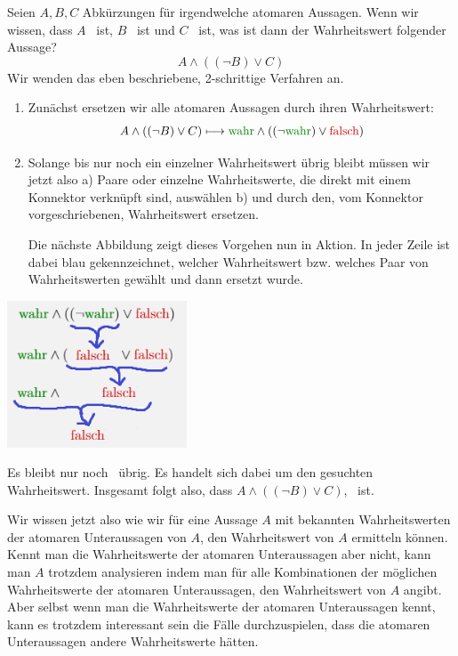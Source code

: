 \documentclass[../../main.tex]{subfiles}
\begin{document}
\begin{example}
Seien $A, B, C$ Abkürzungen für irgendwelche atomaren Aussagen. Wenn wir wissen, dass $A$ \wahr\  ist, $B$ \wahr\  ist und $C$ \falsch\   ist, was ist dann der Wahrheitswert folgender Aussage?
\[A \land ( (\lnot B) \lor C)\]
Wir wenden das eben beschriebene, 2-schrittige Verfahren an.
\begin{enumerate}
    \item Zunächst ersetzen wir alle atomaren Aussagen durch ihren Wahrheitswert:
    \[A \land ( (\lnot B) \lor C) \longmapsto  \wahr \land ((\lnot \wahr) \lor \falsch)\]
    \item Solange bis nur noch ein einzelner Wahrheitswert übrig bleibt müssen wir jetzt also a) Paare oder einzelne Wahrheitswerte, die direkt mit einem Konnektor verknüpft sind, auswählen b) und durch den, vom Konnektor vorgeschriebenen, Wahrheitswert ersetzen.
    
    Die nächste Abbildung zeigt dieses Vorgehen nun in Aktion. In jeder Zeile ist dabei blau gekennzeichnet, welcher Wahrheitswert bzw. welches Paar von Wahrheitswerten gewählt und dann ersetzt wurde. 
\end{enumerate}
\begin{center}
\includegraphics[width=0.4\textwidth]{images/TEMP_wahrheitsalg.png}
\end{center}
Es bleibt nur noch \falsch\  übrig. Es handelt sich dabei um den gesuchten Wahrheitswert. Insgesamt folgt also, dass $A \land ( (\lnot B) \lor C)$, \falsch\  ist.
\end{example}
Wir wissen jetzt also wie wir für eine Aussage $A$ mit bekannten Wahrheitswerten der atomaren Unteraussagen von $A$, den Wahrheitswert von $A$ ermitteln können. Kennt man die Wahrheitswerte der atomaren Unteraussagen aber nicht, kann man $A$ trotzdem analysieren indem man für alle Kombinationen der möglichen Wahrheitswerte der atomaren Unteraussagen, den Wahrheitswert von $A$ angibt. Aber selbst wenn man die Wahrheitswerte der atomaren Unteraussagen kennt, kann es trotzdem interessant sein die Fälle durchzuspielen, dass die atomaren Unteraussagen andere Wahrheitswerte hätten. 
\end{document}
